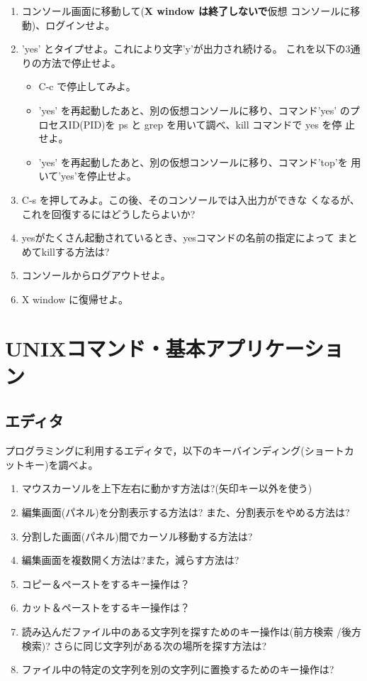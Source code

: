 \documentclass[11pt, twocolumn, ]{jsarticle}
\providecommand{\tightlist}{%
   \setlength{\itemsep}{0pt}\setlength{\parskip}{0pt}}
\begin{document}
\begin{enumerate}
\item
  コンソール画面に移動して(\textbf{X window は終了しないで}仮想
  コンソールに移動)、ログインせよ。
\item
  'yes' とタイプせよ。これにより文字'y'が出力され続ける。
  これを以下の3通りの方法で停止せよ。

  \begin{itemize}
  \item
    C-c で停止してみよ。
  \item
    'yes' を再起動したあと、別の仮想コンソールに移り、コマンド'yes'
    のプロセスID(PID)を ps と grep を用いて調べ、kill コマンドで yes
    を停 止せよ。
  \item
    'yes' を再起動したあと、別の仮想コンソールに移り、コマンド'top'を
    用いて'yes'を停止せよ。
  \end{itemize}
\item
  C-s を押してみよ。この後、そのコンソールでは入出力ができな
  くなるが、これを回復するにはどうしたらよいか?
\item
  yesがたくさん起動されているとき、yesコマンドの名前の指定によって
  まとめてkillする方法は?
\item
  コンソールからログアウトせよ。
\item
  X window に復帰せよ。
\end{enumerate}

\hypertarget{unixux30b3ux30deux30f3ux30c9ux57faux672cux30a2ux30d7ux30eaux30b1ux30fcux30b7ux30e7ux30f3}{%
\section{UNIXコマンド・基本アプリケーション}\label{unixux30b3ux30deux30f3ux30c9ux57faux672cux30a2ux30d7ux30eaux30b1ux30fcux30b7ux30e7ux30f3}}

\hypertarget{ux30a8ux30c7ux30a3ux30bf}{%
\subsection{エディタ}\label{ux30a8ux30c7ux30a3ux30bf}}

プログラミングに利用するエディタで，以下のキーバインディング(ショートカットキー)を調べよ。

\begin{enumerate}
\tightlist
\item
  マウスカーソルを上下左右に動かす方法は?(矢印キー以外を使う)
\item
  編集画面(パネル)を分割表示する方法は? また、分割表示をやめる方法は?
\item
  分割した画面(パネル)間でカーソル移動する方法は?
\item
  編集画面を複数開く方法は?また，減らす方法は?
\item
  コピー＆ペーストをするキー操作は？
\item
  カット＆ペーストをするキー操作は？
\item
  読み込んだファイル中のある文字列を探すためのキー操作は(前方検索
  /後方検索)? さらに同じ文字列がある次の場所を探す方法は?
\item
  ファイル中の特定の文字列を別の文字列に置換するためのキー操作は?
\end{enumerate}
\end{document}
